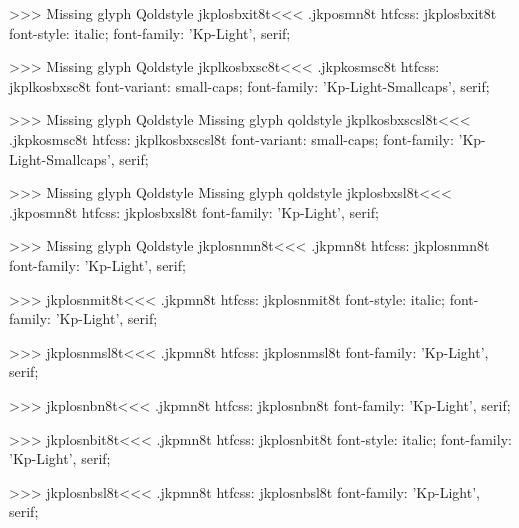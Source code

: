 >>>
Missing glyph	Qoldstyle
\<jkplosbxit8t\><<<
.jkposmn8t
htfcss:  jkplosbxit8t  font-style: italic; font-family: 'Kp-Light', serif;

>>>
Missing glyph	Qoldstyle
\<jkplkosbxsc8t\><<<
.jkpkosmsc8t
htfcss:  jkplkosbxsc8t  font-variant: small-caps; font-family: 'Kp-Light-Smallcaps', serif;

>>>
Missing glyph	Qoldstyle
Missing glyph	qoldstyle
\<jkplkosbxscsl8t\><<<
.jkpkosmsc8t
htfcss:  jkplkosbxscsl8t  font-variant: small-caps; font-family: 'Kp-Light-Smallcaps', serif;

>>>
Missing glyph	Qoldstyle
Missing glyph	qoldstyle
\<jkplosbxsl8t\><<<
.jkposmn8t
htfcss:  jkplosbxsl8t  font-family: 'Kp-Light', serif;

>>>
Missing glyph	Qoldstyle
\<jkplosnmn8t\><<<
.jkpmn8t
htfcss:  jkplosnmn8t  font-family: 'Kp-Light', serif;

>>>
\<jkplosnmit8t\><<<
.jkpmn8t
htfcss:  jkplosnmit8t  font-style: italic; font-family: 'Kp-Light', serif;

>>>
\<jkplosnmsl8t\><<<
.jkpmn8t
htfcss:  jkplosnmsl8t  font-family: 'Kp-Light', serif;

>>>
\<jkplosnbn8t\><<<
.jkpmn8t
htfcss:  jkplosnbn8t  font-family: 'Kp-Light', serif;

>>>
\<jkplosnbit8t\><<<
.jkpmn8t
htfcss:  jkplosnbit8t  font-style: italic; font-family: 'Kp-Light', serif;

>>>
\<jkplosnbsl8t\><<<
.jkpmn8t
htfcss:  jkplosnbsl8t  font-family: 'Kp-Light', serif;

